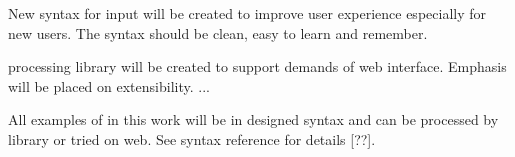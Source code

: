 New syntax for \lsystem input will be created to improve user experience especially for new users.
The syntax should be clean, easy to learn and remember.

\lsystem processing library will be created to support demands of web interface.
Emphasis will be placed on extensibility.
...

All examples of \lsystems in this work will be in designed syntax and can be processed by library or tried on web.
See syntax reference for details [??].












































